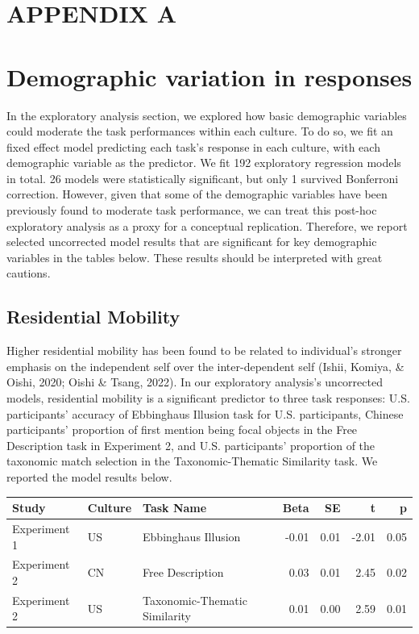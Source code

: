 \documentclass[
  man,floatsintext]{apa6}
\begin{document}
\hypertarget{appendix-a}{%
\section{APPENDIX A}\label{appendix-a}}

\hypertarget{demographic-variation-in-responses}{%
\section{Demographic variation in responses}\label{demographic-variation-in-responses}}

In the exploratory analysis section, we explored how basic demographic variables could moderate the task performances within each culture. To do so, we fit an fixed effect model predicting each task's response in each culture, with each demographic variable as the predictor. We fit 192 exploratory regression models in total. 26 models were statistically significant, but only 1 survived Bonferroni correction. However, given that some of the demographic variables have been previously found to moderate task performance, we can treat this post-hoc exploratory analysis as a proxy for a conceptual replication. Therefore, we report selected uncorrected model results that are significant for key demographic variables in the tables below. These results should be interpreted with great cautions.

\hypertarget{residential-mobility}{%
\subsection{Residential Mobility}\label{residential-mobility}}

Higher residential mobility has been found to be related to individual's stronger emphasis on the independent self over the inter-dependent self (Ishii, Komiya, \& Oishi, 2020; Oishi \& Tsang, 2022). In our exploratory analysis's uncorrected models, residential mobility is a significant predictor to three task responses: U.S. participants' accuracy of Ebbinghaus Illusion task for U.S. participants, Chinese participants' proportion of first mention being focal objects in the Free Description task in Experiment 2, and U.S. participants' proportion of the taxonomic match selection in the Taxonomic-Thematic Similarity task. We reported the model results below.

\begin{table}
\centering\begingroup\fontsize{9.5}{11.5}\selectfont

\begin{tabular}{l|l|l|r|r|r|r}
\hline
Study & Culture & Task Name & Beta & SE & t & p\\
\hline
Experiment 1 & US & Ebbinghaus Illusion & -0.01 & 0.01 & -2.01 & 0.05\\
Experiment 2 & CN & Free Description & 0.03 & 0.01 & 2.45 & 0.02\\
Experiment 2 & US & Taxonomic-Thematic Similarity & 0.01 & 0.00 & 2.59 & 0.01\\
\hline
\end{tabular}
\endgroup{}
\end{table}
\end{document}
